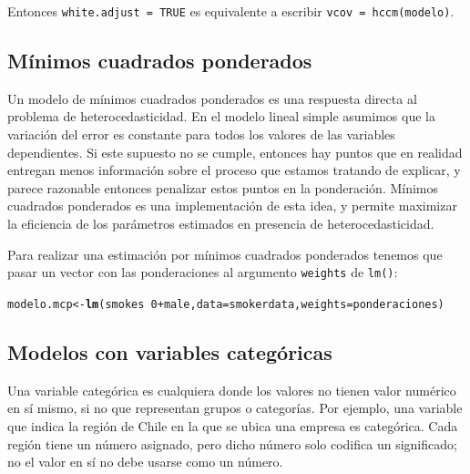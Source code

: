 \documentclass{article}\usepackage[]{graphicx}\usepackage[]{color}
\makeatletter
\newcommand{\hlnum}[1]{\textcolor[rgb]{0.686,0.059,0.569}{#1}}%
\newcommand{\hlopt}[1]{\textcolor[rgb]{0,0,0}{#1}}%
\newcommand{\hlstd}[1]{\textcolor[rgb]{0.345,0.345,0.345}{#1}}%
\newcommand{\hlkwb}[1]{\textcolor[rgb]{0.69,0.353,0.396}{#1}}%
\newcommand{\hlkwc}[1]{\textcolor[rgb]{0.333,0.667,0.333}{#1}}%
\newcommand{\hlkwd}[1]{\textcolor[rgb]{0.737,0.353,0.396}{\textbf{#1}}}%
\newenvironment{kframe}{%
 \def\at@end@of@kframe{}%
 \ifinner\ifhmode%
  \def\at@end@of@kframe{\end{minipage}}%
  \begin{minipage}{\columnwidth}%
 \fi\fi%
 \def\FrameCommand##1{\hskip\@totalleftmargin \hskip-\fboxsep
 \colorbox{shadecolor}{##1}\hskip-\fboxsep
     \hskip-\linewidth \hskip-\@totalleftmargin \hskip\columnwidth}%
 \MakeFramed {\advance\hsize-\width
   \@totalleftmargin\z@ \linewidth\hsize
   \@setminipage}}%
 {\par\unskip\endMakeFramed%
 \at@end@of@kframe}
\newenvironment{knitrout}{}{} %
\makeatother
\begin{document}
Entonces \verb|white.adjust = TRUE| es equivalente a escribir \verb|vcov = hccm(modelo)|.


\subsection{Mínimos cuadrados ponderados}

Un modelo de mínimos cuadrados ponderados es una respuesta directa al problema de heterocedasticidad. En el modelo lineal simple asumimos que la variación del error es constante para todos los valores de las variables dependientes. Si este supuesto no se cumple, entonces hay puntos que en realidad entregan menos información sobre el proceso que estamos tratando de explicar, y parece razonable entonces penalizar estos puntos en la ponderación. Mínimos cuadrados ponderados es una implementación de esta idea, y permite maximizar la eficiencia de los parámetros estimados en presencia de heterocedasticidad.

Para realizar una estimación por mínimos cuadrados ponderados tenemos que pasar un vector con las ponderaciones al argumento \verb|weights| de \verb|lm()|:

\begin{knitrout}
\color{fgcolor}\begin{kframe}
\begin{alltt}
\hlstd{modelo.mcp} \hlkwb{<-} \hlkwd{lm}\hlstd{(smokes} \hlopt{~} \hlnum{0} \hlopt{+} \hlstd{male,} \hlkwc{data} \hlstd{= smokerdata,} \hlkwc{weights} \hlstd{= ponderaciones)}
\end{alltt}


{\ttfamily\noindent\bfseries\color{errorcolor}{\#\# Error in is.data.frame(data): object 'smokerdata' not found}}\end{kframe}
\end{knitrout}


\subsection{Modelos con variables categóricas}

Una variable categórica es cualquiera donde los valores no tienen valor numérico en sí mismo, si no que representan grupos o categorías. Por ejemplo, una variable que indica la región de Chile en la que se ubica una empresa es categórica. Cada región tiene un número asignado, pero dicho número solo codifica un significado; no el valor en sí no debe usarse como un número.
\end{document}

